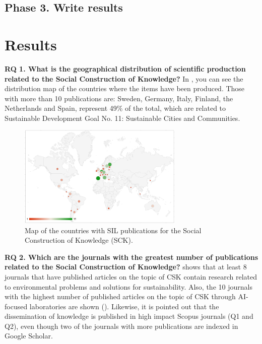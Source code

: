 \documentclass[english]{textolivre}
\begin{document}
\subsection*{Phase 3. Write results}

\section{Results}
\textbf{RQ 1. What is the geographical distribution of scientific production related to the Social Construction of Knowledge?} In , you can see the distribution map of the countries where the items have been produced. Those with more than 10 publications are: Sweden, Germany, Italy, Finland, the Netherlands and Spain, represent 49\% of the total, which are related to Sustainable Development Goal No. 11: Sustainable Cities and Communities.

\begin{figure}[htbp]
 \centering
 \includegraphics[width=0.7\textwidth]{fig3-33750.jpg}
 \caption{Map of the countries with SIL publications for the Social Construction of Knowledge (SCK).}
 \label{fig3}
\end{figure}

\textbf{RQ 2. Which are the journals with the greatest number of publications related to the Social Construction of Knowledge?}  shows that at least 8 journals that have published articles on the topic of CSK contain research related to environmental problems and solutions for sustainability. Also, the 10 journals with the highest number of published articles on the topic of CSK through AI-focused laboratories are shown (). Likewise, it is pointed out that the dissemination of knowledge is published in high impact Scopus journals (Q1 and Q2), even though two of the journals with more publications are indexed in Google Scholar.
\end{document}
